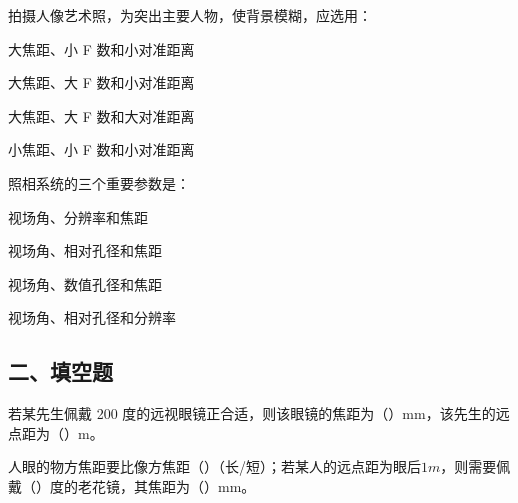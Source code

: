 \documentclass[padl, analysis, notocnum]{ExBook}
\newcommand{\answerarea}[1][3.5cm]{%
  \par\vspace{1mm}%
  \noindent{\color{themeColor!35}\rule{\linewidth}{0.4pt}}\par
  \noindent\begin{minipage}[t][#1][t]{\linewidth}\vspace{0pt}\end{minipage}\par
  \noindent{\color{themeColor!35}\rule{\linewidth}{0.4pt}}\par
}
\begin{document}
\begin{qitems}[startnum=15]
\qitem 拍摄人像艺术照，为突出主要人物，使背景模糊，应选用：
\par\noindent\hspace{2em}大焦距、小 F 数和小对准距离
\par\noindent\hspace{2em}大焦距、大 F 数和小对准距离
\par\noindent\hspace{2em}大焦距、大 F 数和大对准距离
\par\noindent\hspace{2em}小焦距、小 F 数和小对准距离
\label{q:145:start}
\answerarea[4.0cm]
\label{q:145:end}
\end{qitems}

\begin{qitems}[startnum=16]
\qitem 照相系统的三个重要参数是：
\par\noindent\hspace{2em}视场角、分辨率和焦距
\par\noindent\hspace{2em}视场角、相对孔径和焦距
\par\noindent\hspace{2em}视场角、数值孔径和焦距
\par\noindent\hspace{2em}视场角、相对孔径和分辨率
\label{q:146:start}
\answerarea[4.0cm]
\label{q:146:end}
\end{qitems}

\subsection{二、填空题}
\begin{qitems}[startnum=1]
\qitem 若某先生佩戴 200 度的远视眼镜正合适，则该眼镜的焦距为（\hspace{1.6em}）mm，该先生的远点距为（\hspace{1.6em}）m。
\label{q:147:start}
\answerarea[4.0cm]
\label{q:147:end}
\end{qitems}

\begin{qitems}[startnum=2]
\qitem 人眼的物方焦距要比像方焦距（\hspace{1.6em}）（长/短）；若某人的远点距为眼后$1m$，则需要佩戴（\hspace{1.6em}）度的老花镜，其焦距为（\hspace{1.6em}）mm。
\label{q:148:start}
\answerarea[4.0cm]
\label{q:148:end}
\end{qitems}
\end{document}
